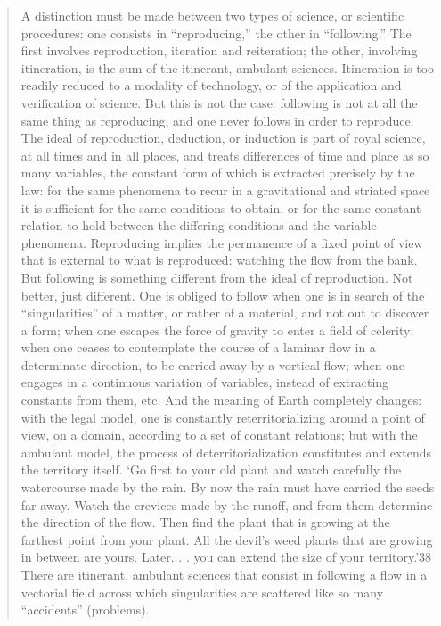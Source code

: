 {\begin{quote}
                A distinction must be made between two types of science, or scientific procedures: one consists in “reproducing,” the other in “following.” The first involves reproduction, iteration and reiteration; the other, involving itineration, is the sum of the itinerant, ambulant sciences. Itineration is too readily reduced to a modality of technology, or of the application and verification of science. But this is not the case: following is not at all the same thing as reproducing, and one never follows in order to reproduce. The ideal of reproduction, deduction, or induction is part of royal science, at all times and in all places, and treats differences of time and place as so many variables, the constant form of which is extracted precisely by the law: for the same phenomena to recur in a gravitational and striated space it is sufficient for the same conditions to obtain, or for the same constant relation to hold between the differing conditions and the variable phenomena. Reproducing implies the permanence of a fixed point of view that is external to what is reproduced: watching the flow from the bank. But following is something different from the ideal of reproduction. Not better, just different. One is obliged to follow when one is in search of the “singularities” of a matter, or rather of a material, and not out to discover a form; when one escapes the force of gravity to enter a field of celerity; when one ceases to contemplate the course of a laminar flow in a determinate direction, to be carried away by a vortical flow; when one engages in a continuous variation of variables, instead of extracting constants from them, etc. And the meaning of Earth completely changes: with the legal model, one is constantly reterritorializing around a point of view, on a domain, according to a set of constant relations; but with the ambulant model, the process of deterritorialization constitutes and extends the territory itself. ‘Go first to your old plant and watch carefully the watercourse made by the rain. By now the rain must have carried the seeds far away. Watch the crevices made by the runoff, and from them determine the direction of the flow. Then find the plant that is growing at the farthest point from your plant. All the devil's weed plants that are growing in between are yours. Later. . . you can extend the size of your territory.’38 There are itinerant, ambulant sciences that consist in following a flow in a vectorial field across which singularities are scattered like so many “accidents” (problems). \citep[p.372]{DeleuzeGuattariAThousandPlateaus1987}
            \end{quote}

}
